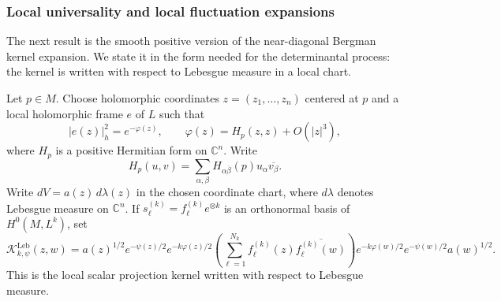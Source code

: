\documentclass[12pt,a4paper,reqno]{article}
\theoremstyle{thmstyleone}
\newtheorem{theorem}{Theorem}[subsection]
\theoremstyle{thmstylethree}
\theoremstyle{thmstyletwo}
\numberwithin{equation}{subsection}
\def\leq{\leqslant}
\def\bar{\overline}
\begin{document}


\subsubsection{Local universality and local fluctuation expansions}

The next result is the smooth positive version of the near-diagonal Bergman kernel expansion. We state it in the form needed for the determinantal process: the kernel is written with respect to Lebesgue measure in a local chart.

Let $p\in M$. Choose holomorphic coordinates $z=(z_1,\ldots,z_n)$ centered at $p$ and a local holomorphic frame $e$ of $L$ such that
\[
    |e(z)|_h^2=e^{-\varphi(z)},
    \qquad
    \varphi(z)=H_p(z,z)+O(|z|^3),
\]
where $H_p$ is a positive Hermitian form on $\mathbb C^n$. Write
\[
    H_p(u,v)=\sum_{\alpha,\beta}H_{\alpha\bar\beta}(p)
    u_\alpha\overline{v_\beta}.
\]
Write $dV=a(z)\,d\lambda(z)$ in the chosen coordinate chart, where $d\lambda$ denotes Lebesgue measure on $\mathbb C^n$. If $s_\ell^{(k)}=f_\ell^{(k)}e^{\otimes k}$ is an orthonormal basis of $H^0(M,L^k)$, set
\[
\mathcal K_{k,\psi}^{\mathrm{Leb}}(z,w)
=
a(z)^{1/2}e^{-\psi(z)/2}e^{-k\varphi(z)/2}
\left(
\sum_{\ell=1}^{N_k}
f_\ell^{(k)}(z)\overline{f_\ell^{(k)}(w)}
\right)
e^{-k\varphi(w)/2}e^{-\psi(w)/2}a(w)^{1/2}.
\]
This is the local scalar projection kernel written with respect to Lebesgue measure.
\end{document}
